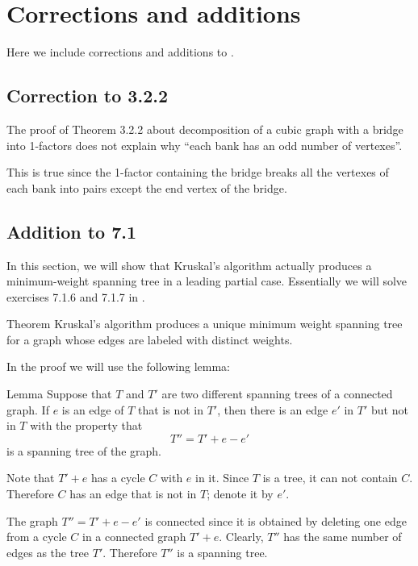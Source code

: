 \chapter{Corrections and additions}

Here we include corrections and additions to \cite{pearls}.

\section*{Correction to 3.2.2}

The proof of Theorem 3.2.2 about decomposition of a cubic graph with a bridge into 1-factors
does not explain why ``each bank has an odd number of vertexes''.

This is true since the 1-factor containing the bridge breaks all the vertexes of each bank into pairs except the end vertex of the bridge.



\section*{Addition to 7.1}

In this section, we will show that Kruskal’s algorithm actually produces a minimum-weight spanning tree in a leading partial case.
Essentially we will solve exercises 7.1.6 and 7.1.7 in \cite{pearls}. 

\begin{thm}{Theorem}
Kruskal’s algorithm produces a unique minimum weight spanning tree for a graph whose edges are labeled with
distinct weights. 

\end{thm}

In the proof we will use the following lemma:

\begin{thm}{Lemma}\label{lem:T+e-e}
Suppose that $T$ and $T'$ are two different spanning trees of a connected
graph. 
If $e$ is an edge of $T$ that is not in $T'$, then there is an edge $e'$
in $T'$ but not in $T$ with the property that 
\[T''=T' + e - e'\]
is a spanning tree of the
graph.
\end{thm}

Note that $T' + e$ has a cycle $C$ with $e$ in it.
Since $T$ is a tree, it can not contain $C$.
Therefore $C$ has an edge that is not in $T$;
denote it by $e'$.

The graph $T''=T' + e-e'$ is connected since it is obtained by deleting one edge from a cycle $C$ in a connected graph $T' + e$.
Clearly, $T''$ has the same number of edges as the tree $T'$.
Therefore $T''$ is a spanning tree.
\qeds

